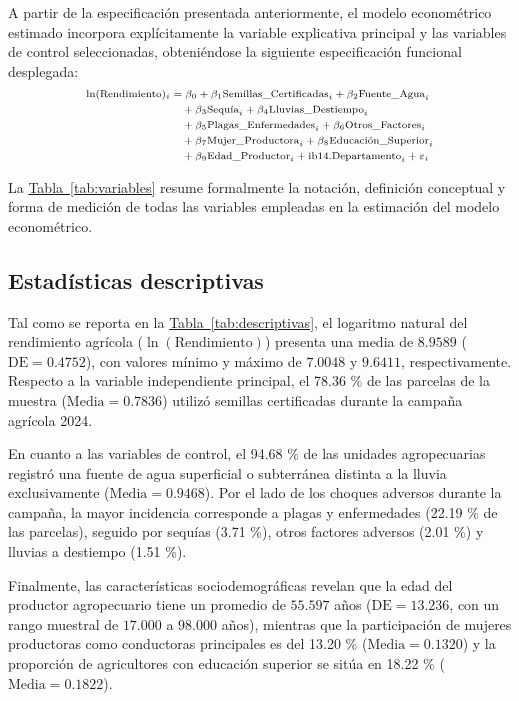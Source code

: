 \documentclass[11pt,a4paper,twocolumn]{article}
\begin{document}
A partir de la especificación presentada anteriormente, el modelo econométrico estimado incorpora explícitamente la variable explicativa principal y las variables de control seleccionadas, obteniéndose la siguiente especificación funcional desplegada:
\begin{equation}
\scriptsize
\begin{split}
    \ln(\text{Rendimiento})_i &= \beta_0 + \beta_1 \text{Semillas\_Certificadas}_i + \beta_2 \text{Fuente\_Agua}_i \\
    &\quad + \beta_3 \text{Sequía}_i + \beta_4 \text{Lluvias\_Destiempo}_i \\
    &\quad + \beta_5 \text{Plagas\_Enfermedades}_i + \beta_6 \text{Otros\_Factores}_i \\
    &\quad + \beta_7 \text{Mujer\_Productora}_i + \beta_8 \text{Educación\_Superior}_i \\
    &\quad + \beta_9 \text{Edad\_Productor}_i + \text{ib14.Departamento}_i + \varepsilon_i
\end{split}
\end{equation}

La \hyperref[tab:variables]{Tabla~\ref*{tab:variables}} resume formalmente la notación, definición conceptual y forma de medición de todas las variables empleadas en la estimación del modelo econométrico.

\subsection{Estadísticas descriptivas}
Tal como se reporta en la \hyperref[tab:descriptivas]{Tabla~\ref*{tab:descriptivas}}, el logaritmo natural del rendimiento agrícola ($\ln(\text{Rendimiento})$) presenta una media de $8.9589$ ($\text{DE} = 0.4752$), con valores mínimo y máximo de $7.0048$ y $9.6411$, respectivamente. Respecto a la variable independiente principal, el 78.36 \% de las parcelas de la muestra ($\text{Media} = 0.7836$) utilizó semillas certificadas durante la campaña agrícola 2024.

En cuanto a las variables de control, el 94.68 \% de las unidades agropecuarias registró una fuente de agua superficial o subterránea distinta a la lluvia exclusivamente ($\text{Media} = 0.9468$). Por el lado de los choques adversos durante la campaña, la mayor incidencia corresponde a plagas y enfermedades (22.19 \% de las parcelas), seguido por sequías (3.71 \%), otros factores adversos (2.01 \%) y lluvias a destiempo (1.51 \%). 

Finalmente, las características sociodemográficas revelan que la edad del productor agropecuario tiene un promedio de $55.597$ años ($\text{DE} = 13.236$, con un rango muestral de $17.000$ a $98.000$ años), mientras que la participación de mujeres productoras como conductoras principales es del 13.20 \% ($\text{Media} = 0.1320$) y la proporción de agricultores con educación superior se sitúa en 18.22 \% ($\text{Media} = 0.1822$).
\end{document}
